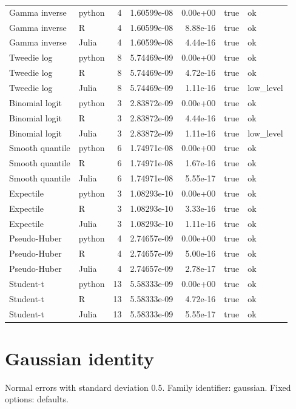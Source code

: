 \documentclass[11pt]{article}
\begin{document}
\begin{longtable}{llrrrll}
Gamma inverse & python & 4 & 1.60599e-08 & 0.00e+00 & true & ok \\
Gamma inverse & R & 4 & 1.60599e-08 & 8.88e-16 & true & ok \\
Gamma inverse & Julia & 4 & 1.60599e-08 & 4.44e-16 & true & ok \\
Tweedie log & python & 8 & 5.74469e-09 & 0.00e+00 & true & ok \\
Tweedie log & R & 8 & 5.74469e-09 & 4.72e-16 & true & ok \\
Tweedie log & Julia & 8 & 5.74469e-09 & 1.11e-16 & true & low\_level \\
Binomial logit & python & 3 & 2.83872e-09 & 0.00e+00 & true & ok \\
Binomial logit & R & 3 & 2.83872e-09 & 4.44e-16 & true & ok \\
Binomial logit & Julia & 3 & 2.83872e-09 & 1.11e-16 & true & low\_level \\
Smooth quantile & python & 6 & 1.74971e-08 & 0.00e+00 & true & ok \\
Smooth quantile & R & 6 & 1.74971e-08 & 1.67e-16 & true & ok \\
Smooth quantile & Julia & 6 & 1.74971e-08 & 5.55e-17 & true & ok \\
Expectile & python & 3 & 1.08293e-10 & 0.00e+00 & true & ok \\
Expectile & R & 3 & 1.08293e-10 & 3.33e-16 & true & ok \\
Expectile & Julia & 3 & 1.08293e-10 & 1.11e-16 & true & ok \\
Pseudo-Huber & python & 4 & 2.74657e-09 & 0.00e+00 & true & ok \\
Pseudo-Huber & R & 4 & 2.74657e-09 & 5.00e-16 & true & ok \\
Pseudo-Huber & Julia & 4 & 2.74657e-09 & 2.78e-17 & true & ok \\
Student-t & python & 13 & 5.58333e-09 & 0.00e+00 & true & ok \\
Student-t & R & 13 & 5.58333e-09 & 4.72e-16 & true & ok \\
Student-t & Julia & 13 & 5.58333e-09 & 5.55e-17 & true & ok \\
\bottomrule\end{longtable}\normalsize
\section{Gaussian identity}
Normal errors with standard deviation 0.5. Family identifier: gaussian. Fixed options: defaults.
\end{document}
